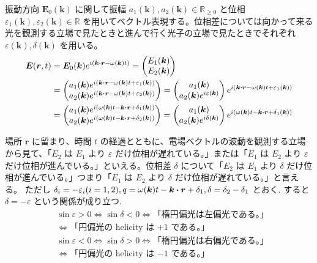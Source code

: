 \documentclass[uplatex,dvipdfmx,a4paper,11pt]{jlreq}
\newcommand{\RR}{\mathbb{R}}
\newcommand{\EE}{\bm{E}}
\newcommand{\rr}{\bm{r}}
\newcommand{\kk}{\bm{k}}
\theoremstyle{definition}
\begin{document}
\begin{definition}[偏光]
  振動方向 $\EE_0(\kk)$ に関して振幅 $a_1(\kk), a_2(\kk)\in\RR_{\geq 0}$ と位相 $\varepsilon_1(\kk), \varepsilon_2(\kk)\in\RR$ を用いてベクトル表現する。位相差については向かって来る光を観測する立場で見たときと進んで行く光子の立場で見たときでそれぞれ $\varepsilon(\kk), \delta(\kk)$ を用いる。
  \begin{align}
    \EE(\rr, t) & = \EE_0(\kk)e^{i(\kk\vdot\rr - \omega(\kk)t)}
    = \begin{pmatrix}
        E_1(\kk) \\
        E_2(\kk)
      \end{pmatrix}                                                                                \\
                & = \begin{pmatrix}
                      a_1(\kk)e^{i(\kk\vdot\rr - \omega(\kk)t + \varepsilon_1(\kk))} \\
                      a_2(\kk)e^{i(\kk\vdot\rr - \omega(\kk)t + \varepsilon_2(\kk))}
                    \end{pmatrix}
    =
    \begin{pmatrix}
      a_1(\kk) \\
      a_2(\kk)e^{i\varepsilon(\kk)}
    \end{pmatrix}e^{i(\kk\vdot\rr - \omega(\kk)t + \varepsilon_1(\kk))}                             \\
                & =
    \begin{pmatrix}
      a_1(\kk)e^{i(\omega(\kk)t - \kk\vdot\rr + \delta_1(\kk))} \\
      a_2(\kk)e^{i(\omega(\kk)t - \kk\vdot\rr + \delta_2(\kk))}
    \end{pmatrix}
    =
    \begin{pmatrix}
      a_1(\kk) \\
      a_2(\kk)e^{i\delta(\kk)}
    \end{pmatrix}e^{i(\omega(\kk)t - \kk\vdot\rr + \delta_1(\kk))}
  \end{align}
\end{definition}
場所 $\rr$ に留まり、時間 $t$ の経過とともに、電場ベクトルの波動を観測する立場から見て、「$E_2$ は $E_1$ より $\varepsilon$ だけ位相が遅れている。」または「$E_1$ は $E_2$ より $\varepsilon$ だけ位相が進んでいる。」といえる。位相差 $\delta$ について「$E_2$ は $E_1$ より $\delta$ だけ位相が進んでいる。」つまり「$E_1$ は $E_2$ より $\delta$ だけ位相が遅れている。」と言える。
ただし $\delta_i = - \varepsilon_i (i = 1, 2), q = \omega(\kk)t - \kk\vdot\rr + \delta_1, \delta = \delta_2 - \delta_1$ とおく. すると $\delta = -\varepsilon$ という関係が成り立つ.
\begin{align}
   & \sin\varepsilon > 0 \iff \sin\delta < 0 \iff \text{「楕円偏光は左偏光である。」} \\
   & \iff \text{「円偏光の helicity は $+1$ である。」}                            \\
   & \sin\varepsilon < 0 \iff \sin\delta > 0 \iff \text{「楕円偏光は右偏光である。」} \\
   & \iff \text{「円偏光の helicity は $-1$ である。」}
\end{align}
\end{document}
